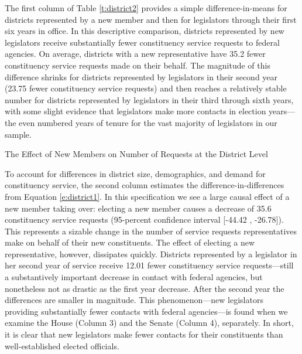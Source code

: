 \documentclass[12pt]{article}
\begin{document}
The first column of Table \ref{t:district2} provides a simple difference-in-means for districts represented by a new member and then for legislators through their first six years in office. In this descriptive comparison, districts represented by new legislators receive substantially fewer constituency service requests to federal agencies. On average, districts with a new representative have 35.2 fewer constituency service requests made on their behalf. The magnitude of this difference shrinks for districts represented by legislators in their second year (23.75 fewer constituency service requests) and then reaches a relatively stable number for districts represented by legislators in their third through sixth years, with some slight evidence that legislators make more contacts in election years---the even numbered years of tenure for the vast majority of legislators in our sample. 



\begin{table}[hbt!]
\caption{The Effect of New Members on Number of Requests at the District Level} \label{t:district2}
\begin{minipage}{\textwidth}
\begin{center}

\end{center}
\end{minipage}
\end{table}


To account for differences in district size, demographics, and demand for constituency service, the second column estimates the difference-in-differences from Equation \ref{e:district1}. In this specification we see a large causal effect of a new member taking over: electing a new member causes a decrease of 35.6 constituency service requests (95-percent confidence interval [-44.42 , -26.78]). This represents a sizable change in the number of service requests representatives make on behalf of their new constituents. The effect of electing a new representative, however, dissipates quickly. Districts represented by a legislator in her second year of service receive 12.01 fewer constituency service requests---still a substantively important decrease in contact with federal agencies, but nonetheless not as drastic as the first year decrease. After the second year the differences are smaller in magnitude. This phenomenon---new legislators providing substantially fewer contacts with federal agencies---is found when we examine the House (Column 3) and the Senate (Column 4), separately. In short, it is clear that new legislators make fewer contacts for their constituents than well-established elected officials.  
\end{document}
